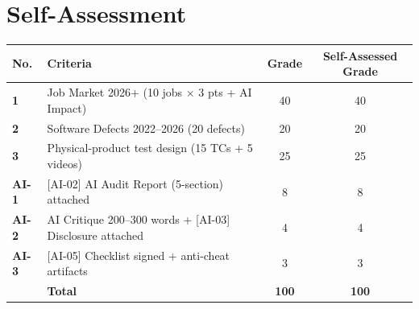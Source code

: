 \documentclass[12pt]{article}
\begin{document}
\newpage

\vspace{1cm}

\vspace{1cm}

\vspace{1cm}

\vspace{1cm}

\vspace{1cm}

\vspace{1cm}
\section{Self-Assessment}
\vspace{0.5cm}

\begin{center}
\begin{tabular}{|>{\bfseries}l|p{7cm}|c|c|}
\hline
\textbf{No.} & \textbf{Criteria} & \textbf{Grade} & \textbf{Self-Assessed Grade} \\
\hline
1 & Job Market 2026+ (10 jobs $\times$ 3 pts + AI Impact) & 40 & 40  \\
\hline
2 & Software Defects 2022--2026 (20 defects) & 20 & 20 \\
\hline
3 & Physical-product test design (15 TCs + 5 videos) & 25 & 25 \\
\hline
AI-1 & {[AI-02]} AI Audit Report (5-section) attached & 8 & 8 \\
\hline
AI-2 & AI Critique 200--300 words + {[AI-03]} Disclosure attached & 4 & 4 \\
\hline
AI-3 & {[AI-05]} Checklist signed + anti-cheat artifacts & 3 & 3 \\
\hline
 & \textbf{Total} & \textbf{100} & \textbf{100} \\
\hline
\end{tabular}
\end{center}
\end{document}
